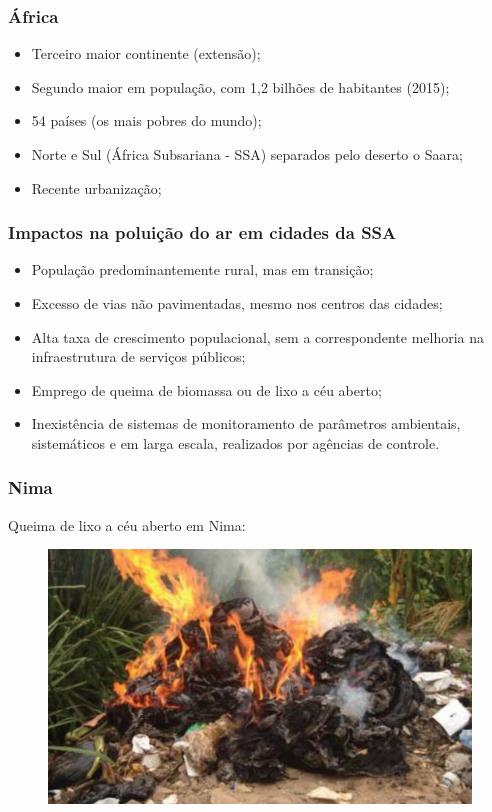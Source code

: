 \begin{frame}
  \frametitle{África}
   \begin{itemize}
     \item Terceiro maior continente (extensão);
     \item Segundo maior em população, com 1,2 bilhões de habitantes (2015);
     \item 54 países (os mais pobres do mundo);
     \item Norte e Sul (África Subsariana - SSA) separados pelo deserto o Saara;
     \item Recente urbanização;
   \end{itemize}
\end{frame}

\begin{frame}
  \frametitle{Impactos na poluição do ar em cidades da SSA}
  \begin{itemize}
    \item População predominantemente rural, mas em transição;
    \item Excesso de vias não pavimentadas, mesmo nos centros das cidades;
    \item Alta taxa de crescimento populacional, sem a correspondente melhoria 
        na infraestrutura de serviços públicos;
    \item Emprego de queima de biomassa ou de lixo a céu aberto;
    \item Inexistência de sistemas de monitoramento de parâmetros ambientais, sistemáticos e em larga escala,
        realizados por agências de controle.
  \end{itemize}
\end{frame}

\begin{frame}
  \frametitle{Nima}
  \begin{center}
  Queima de lixo a céu aberto em Nima:
  \end{center}
  \begin{figure}[H]
    \centering
      \includegraphics[width=0.5\linewidth]{../../inputs/images/zheng/arku3.jpeg}
  \end{figure} 
\end{frame}



